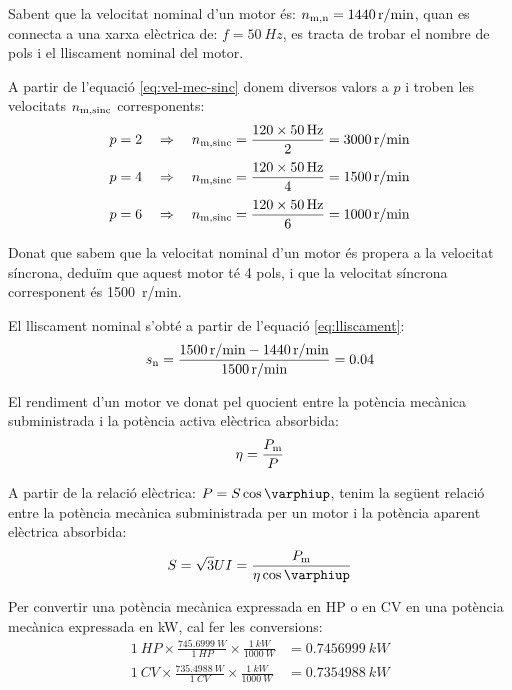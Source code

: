 \begin{exemple}
    Sabent que la velocitat nominal d'un motor és: $n_\mathrm{m,n} = \SI{1440}{r/min}$, quan es connecta a una xarxa elèctrica de: $f = \SI{50}{Hz}$,  es tracta de trobar el nombre de pols i el lliscament nominal del motor.

    A partir de l'equació \eqref{eq:vel-mec-sinc} donem diversos valors a $p$ i troben les velocitats $n_\mathrm{m,sinc}$ corresponents:
    \begin{align*}
      p = 2 \quad  &\Rightarrow \quad n_\mathrm{m,sinc} = \frac{120 \times \SI{50}{Hz}}{2} = \SI{3000}{r/min}\\[0.5ex]
      p = 4 \quad  &\Rightarrow \quad n_\mathrm{m,sinc} = \frac{120 \times \SI{50}{Hz}}{4} = \SI{1500}{r/min}\\[0.5ex]
      p = 6 \quad  &\Rightarrow \quad n_\mathrm{m,sinc} = \frac{120 \times \SI{50}{Hz}}{6} = \SI{1000}{r/min}
    \end{align*}

    Donat que sabem que la velocitat nominal d'un motor és propera a la velocitat síncrona, deduïm que aquest motor té 4 pols, i que la velocitat síncrona corresponent és \SI{1500}{r/min}.

    El lliscament nominal s'obté a partir de l'equació \eqref{eq:lliscament}:
    \[
      s_\mathrm{n} = \frac{\SI{1500}{r/min} - \SI{1440}{r/min}}{\SI{1500}{r/min}} = \num{0,04}
    \]
\end{exemple}

El rendiment d'un motor ve donat pel quocient entre la potència mecànica subministrada i la potència activa elèctrica absorbida:
\begin{equation}\index{rendiment}\index{potència mecànica}
    \eta = \frac{P\ped{m}}{P}
\end{equation}

A partir de la relació elèctrica: $P = S \cos\varphiup$, tenim la següent relació entre la potència mecànica subministrada per un motor i la potència aparent elèctrica absorbida:
\begin{equation}
    S = \sqrt{3} U I = \frac{P\ped{m}}{\eta \cos\varphiup}\label{eq:mot-S-Pm}
\end{equation}

Per  convertir una potència mecànica expressada en HP o en CV en una  potència mecànica expressada en kW, cal  fer les conversions:
\begin{subequations}
\begin{align}
  \SI{1}{HP} \times \frac{\SI{745,6999}{W}}{\SI{1}{HP}} \times \frac{\SI{1}{kW}}{\SI{1000}{W}} &= \SI{0,7456999}{kW} \\[1ex]
  \SI{1}{CV} \times \frac{\SI{735,4988}{W}}{\SI{1}{CV}} \times \frac{\SI{1}{kW}}{\SI{1000}{W}} &= \SI{0,7354988}{kW}
\end{align}
\end{subequations}

